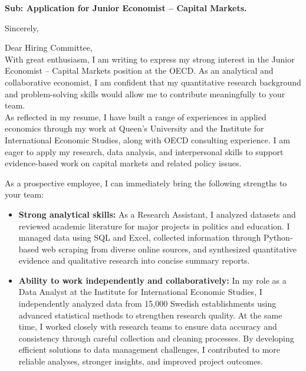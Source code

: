 \documentclass[11pt,a4paper,roman]{moderncv}
\begin{document}
\date{\today}
\opening{\textbf{Sub: Application for Junior Economist – Capital Markets.}}
\closing{Sincerely, \vspace{-1em}}


\makelettertitle



Dear Hiring Committee,
\\
\vspace{1em}
With great enthusiasm, I am writing to express my strong interest in the Junior Economist – Capital Markets position at the OECD. As an analytical and collaborative economist, I am confident that my quantitative research background and problem-solving skills would allow me to contribute meaningfully to your team.\\

\vspace{1em}
As reflected in my resume, I have built a range of experiences in applied economics through my work at Queen's University and the Institute for International Economic Studies, along with OECD consulting experience. I am eager to apply my research, data analysis, and interpersonal skills to support evidence-based work on capital markets and related policy issues.\\
\vspace{1em}

As a prospective employee, I can immediately bring the following strengths to your team:
\vspace{0.5em}
\begin{itemize}
\item \textbf{Strong analytical skills:} As a Research Assistant, I analyzed datasets and reviewed academic literature for major projects in politics and education. I managed data using SQL and Excel, collected information through Python-based web scraping from diverse online sources, and synthesized quantitative evidence and qualitative research into concise summary reports.
\item \textbf{Ability to work independently and collaboratively:} In my role as a Data Analyst at the Institute for International Economic Studies, I independently analyzed data from 15,000 Swedish establishments using advanced statistical methods to strengthen research quality. At the same time, I worked closely with research teams to ensure data accuracy and consistency through careful collection and cleaning processes. By developing efficient solutions to data management challenges, I contributed to more reliable analyses, stronger insights, and improved project outcomes.
\end{itemize}
\end{document}
